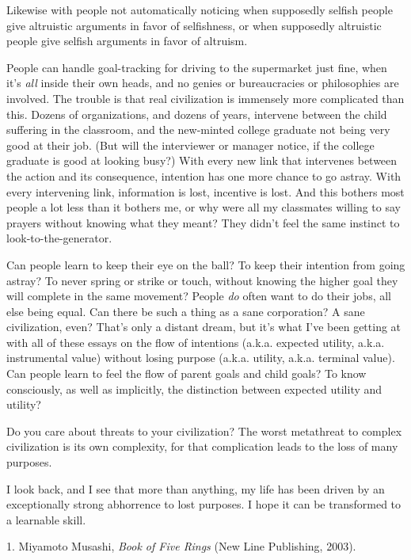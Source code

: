 {
 Likewise with people not automatically noticing when supposedly
selfish people give altruistic arguments in favor of selfishness, or
when supposedly altruistic people give selfish arguments in favor of
altruism.}

{
 People can handle goal-tracking for driving to the supermarket
just fine, when it's \textit{all} inside their own
heads, and no genies or bureaucracies or philosophies are involved. The
trouble is that real civilization is immensely more complicated than
this. Dozens of organizations, and dozens of years, intervene between
the child suffering in the classroom, and the new-minted college
graduate not being very good at their job. (But will the interviewer or
manager notice, if the college graduate is good at looking busy?) With
every new link that intervenes between the action and its consequence,
intention has one more chance to go astray. With every intervening
link, information is lost, incentive is lost. And this bothers most
people a lot less than it bothers me, or why were all my classmates
willing to say prayers without knowing what they meant? They
didn't feel the same instinct to
look-to-the-generator.}

{
 Can people learn to keep their eye on the ball? To keep their
intention from going astray? To never spring or strike or touch,
without knowing the higher goal they will complete in the same
movement? People \textit{do} often want to do their jobs, all else
being equal. Can there be such a thing as a sane corporation? A sane
civilization, even? That's only a distant dream, but
it's what I've been getting at with all
of these essays on the flow of intentions (a.k.a. expected utility,
a.k.a. instrumental value) without losing purpose (a.k.a. utility,
a.k.a. terminal value). Can people learn to feel the flow of parent
goals and child goals? To know consciously, as well as implicitly, the
distinction between expected utility and utility?}

{
 Do you care about threats to your civilization? The worst
metathreat to complex civilization is its own complexity, for that
complication leads to the loss of many purposes.}

{
 I look back, and I see that more than anything, my life has been
driven by an exceptionally strong abhorrence to lost purposes. I hope
it can be transformed to a learnable skill.}

\myendsectiontext


\bigskip

{
 1. Miyamoto Musashi, \textit{Book of Five Rings} (New Line
Publishing, 2003).}

